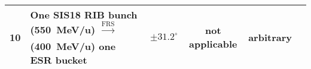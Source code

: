 \begin{table*}[hbp]
\begin{center}
\begin{tabular}{| c | p{4cm}| p{2cm} | c | c |p{7cm} |}
10&One SIS18 RIB bunch (\SI{550}{MeV/u}) $\xrightarrow[\text{}]{\text{FRS}}$ (\SI{400}{MeV/u}) one ESR bucket &$\pm31.2^\circ$	& not applicable & arbitrary&		\\ \hline

    \end{tabular}
\end{center}
\end{table*}